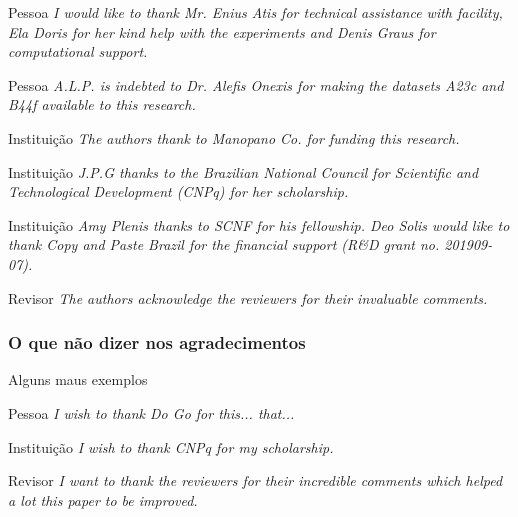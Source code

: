 \begin{frame}
\begin{block}{Pessoa}
\emph{I would like to thank Mr. Enius Atis for technical assistance with facility, Ela Doris for her kind help with the experiments and Denis Graus for computational support.}
\end{block}

\begin{block}{Pessoa}
\emph{A.L.P. is indebted to Dr. Alefis Onexis for making the datasets A23c and B44f available to this research.}
\end{block}
\end{frame}

\begin{frame}
\begin{block}{Instituição}
\emph{The authors thank to Manopano Co. for funding this research.}
\end{block}

\begin{block}{Instituição}
\emph{J.P.G thanks to the Brazilian National Council for Scientific and Technological Development (CNPq) for her scholarship.}
\end{block}
\end{frame}

\begin{frame}
\begin{block}{Instituição}
\emph{Amy Plenis thanks to SCNF for his fellowship. Deo Solis would like to thank Copy and Paste Brazil for the financial support (R{\&}D grant no. 201909-07).}
\end{block}

\begin{block}{Revisor}
\emph{The authors acknowledge the reviewers for their invaluable comments.}
\end{block}
\end{frame}

\subsubsection{O que não dizer nos agradecimentos}

\begin{frame}{Alguns maus exemplos}
\begin{block}{Pessoa}
\emph{I wish to thank Do Go for this... that...}  
\end{block}

\begin{block}{Instituição}
\emph{I wish to thank CNPq for my scholarship.}  
\end{block}

\begin{block}{Revisor}
\emph{I want to thank the reviewers for their incredible comments which helped a lot this paper to be improved.}  
\end{block}
\end{frame}

